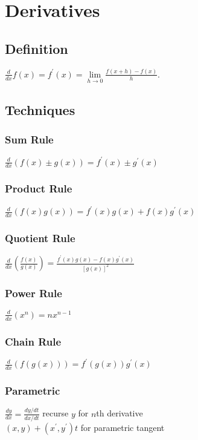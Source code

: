 \documentclass[10pt,landscape,letterpaper]{cheatsheet}
\begin{document}
\section*{Derivatives}
\subsection*{Definition}
$ \frac{d}{dx}f(x) = f^{\prime}(x) = \lim\limits_{h\to 0}\frac{f(x+h)-f(x)}{h}$.
\subsection*{Techniques}

\subsubsection*{Sum Rule}
$ \frac{d}{dx}(f(x) \pm g(x))=f^{\prime}(x) \pm g^{\prime}(x) $

\subsubsection*{Product Rule}
$ \frac{d}{dx}(f(x)g(x))=f^{\prime}(x)g(x)+f(x)g^{\prime}(x) $

\subsubsection*{Quotient Rule}
$ \frac{d}{dx}\left(\frac{f(x)}{g(x)}\right)=\frac{f^{\prime}(x)g(x)-f(x)g^{\prime}(x)}{[g(x)]^2} $

\subsubsection*{Power Rule}
$ \frac{d}{dx}(x^n)=nx^{n-1} $

\subsubsection*{Chain Rule}
$ \frac{d}{dx}(f(g(x)))=f^{\prime}(g(x))g^{\prime}(x) $

\subsubsection*{Parametric}
$\frac{dy}{dx}=\frac{dy/dt}{dx/dt}$ recurse $y$ for $n$th derivative\\
$(x,y)+(x^\prime,y^\prime)t$ for parametric tangent
\end{document}
